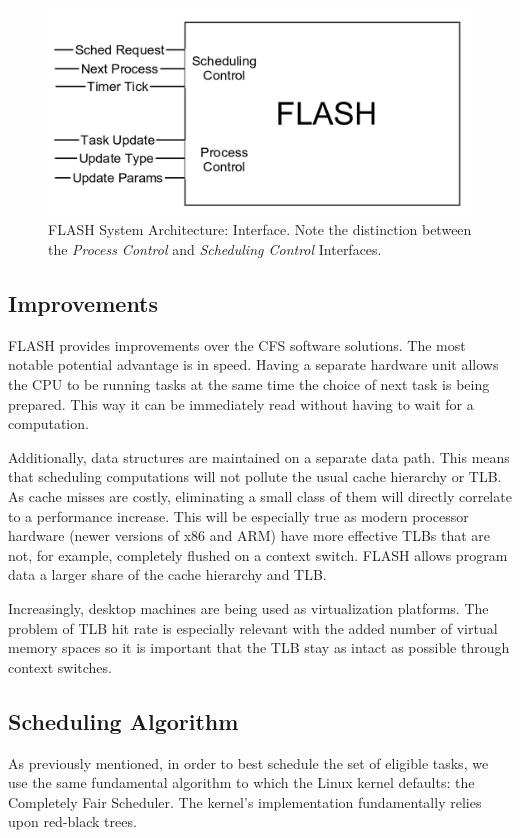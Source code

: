\documentclass{sig-alternate-10pt}
\begin{document}
\begin{figure}
	\begin{center}
		\includegraphics[width=0.9\linewidth]{fig/flash-diagram.png}
		\caption{
			FLASH System Architecture: Interface.  Note the distinction between
			the \emph{Process Control} and \emph{Scheduling Control} Interfaces.
		}
		\label{fig:arch_overview}
	\end{center}
\end{figure}

\subsection{Improvements}
FLASH provides improvements over the CFS software solutions.  The most
notable potential advantage is in speed.  Having a separate hardware unit
allows the CPU to be running tasks at the same time the choice of next task
is being prepared.  This way it can be immediately read without having to
wait for a computation.

Additionally, data structures are maintained on a separate data path.  This
means that scheduling computations will not pollute the usual cache
hierarchy or TLB.  As cache misses are costly, eliminating a small class of
them will directly correlate to a performance increase.  This will be
especially true as modern processor hardware (newer versions of x86 and ARM)
have more effective TLBs that are not, for example, completely flushed on
a context switch\cite{neiger2006intel}.  FLASH allows program data a larger
share of the cache hierarchy and TLB.

Increasingly, desktop machines are being used as virtualization platforms.
The problem of TLB hit rate is especially relevant with the added number of
virtual memory spaces so it is important that the TLB stay as intact as
possible through context switches.

\subsection{Scheduling Algorithm}
As previously mentioned, in order to best schedule the set of eligible
tasks, we use the same fundamental algorithm to which the Linux kernel
defaults: the Completely Fair Scheduler.  The kernel's implementation
fundamentally relies upon red-black trees.
\end{document}
